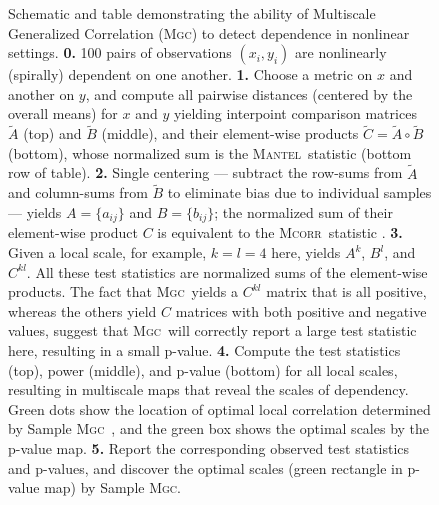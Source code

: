 \documentclass[11pt]{article}
\providecommand{\sct}[1]{{\normalfont\textsc{#1}}}
\newcommand{\Mgc}{\sct{Mgc}}
\newcommand{\Mcorr}{\sct{Mcorr}}
\newcommand{\Mantel}{\sct{Mantel}}
\begin{document}
\begin{figure}[htbp]
\caption{
Schematic  and table demonstrating the ability of Multiscale Generalized Correlation (\Mgc) to detect dependence in nonlinear settings. 
\textbf{0.} 100 pairs of observations $(x_i,y_i)$ are nonlinearly (spirally) dependent on one another.
% 
\textbf{1.} Choose a metric on $x$ and another on $y$, and compute all pairwise distances (centered by the overall means) for $x$ and $y$ yielding interpoint comparison matrices
 $\tilde{A}$ (top) and $\tilde{B}$ (middle), 
and their element-wise products $\tilde{C}=\tilde{A} \circ \tilde{B}$ (bottom), whose normalized sum is the  \Mantel~statistic \cite{Mantel1967} (bottom row of table).
% 
\textbf{2.} Single centering --- subtract the row-sums from $\tilde{A}$ and column-sums from $\tilde{B}$ to eliminate bias due to individual samples --- yields $A=\{a_{ij}\}$ and $B=\{b_{ij}\}$; the normalized sum of their  element-wise product  $C$ is equivalent to the  \Mcorr~statistic \cite{SzekelyRizzo2013a}.
% 
\textbf{3.} Given a local scale, for example, $k=l=4$ here, yields $A^{k}$, $B^{l}$, and $C^{kl}$.  All these test statistics are normalized sums of the element-wise products. The fact that \Mgc~yields a $C^{kl}$ matrix that is all positive, whereas the others yield $C$ matrices with both positive and negative values, suggest that \Mgc~will correctly report a large test statistic here, resulting in a small p-value.
\textbf{4.} Compute the test statistics (top), power (middle), and p-value (bottom) for all local scales, resulting in multiscale maps that reveal the scales of dependency. Green dots show the location of optimal local correlation determined by Sample \Mgc~, and the green box shows the optimal scales by the p-value map.
\textbf{5.} Report the corresponding observed test statistics and p-values, and discover the optimal scales (green rectangle in  p-value map) by Sample \Mgc.  
}
\end{figure}
\end{document}

